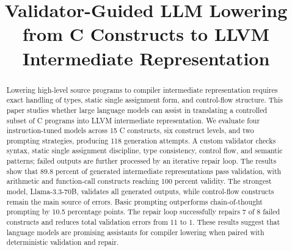 \documentclass[conference]{IEEEtran}
\begin{document}
\title{Validator-Guided LLM Lowering from C Constructs to LLVM Intermediate Representation}
\author{

\and
{}
\and
{}

}

\maketitle

\begin{abstract}
Lowering high-level source programs to compiler intermediate representation requires exact handling of types, static single assignment form, and control-flow structure. This paper studies whether large language models can assist in translating a controlled subset of C programs into LLVM intermediate representation. We evaluate four instruction-tuned models across 15 C constructs, six construct levels, and two prompting strategies, producing 118 generation attempts. A custom validator checks syntax, static single assignment discipline, type consistency, control flow, and semantic patterns; failed outputs are further processed by an iterative repair loop. The results show that 89.8 percent of generated intermediate representations pass validation, with arithmetic and function-call constructs reaching 100 percent validity. The strongest model, Llama-3.3-70B, validates all generated outputs, while control-flow constructs remain the main source of errors. Basic prompting outperforms chain-of-thought prompting by 10.5 percentage points. The repair loop successfully repairs 7 of 8 failed constructs and reduces total validation errors from 11 to 1. These results suggest that language models are promising assistants for compiler lowering when paired with deterministic validation and repair.
\end{abstract}
\end{document}
